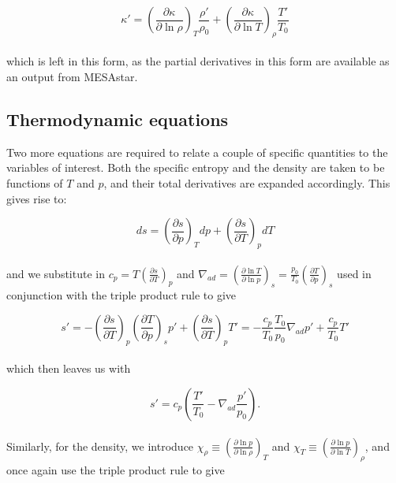 \documentclass[11pt]{amsart}
\begin{document}
\begin{equation}
\kappa' = \left( \frac{\partial \kappa}{\partial \ln \rho} \right)_{T} \frac{\rho'}{\rho_{0}} + \left( \frac{\partial \kappa}{\partial \ln T} \right)_{\rho} \frac{T'}{T_{0}}
\end{equation}
\\
which is left in this form, as the partial derivatives in this form are available as an output from MESAstar.



\subsection{Thermodynamic equations}

Two more equations are required to relate a couple of specific quantities to the variables of interest.
Both the specific entropy and the density are taken to be functions of $T$ and $p$, and their total derivatives
are expanded accordingly.  This gives rise to:

\begin{equation}
ds = \left( \frac{\partial s}{\partial p} \right)_{T} dp +\left( \frac{\partial s}{\partial T} \right)_{p} dT
\end{equation} 
\\
and we substitute in $c_{p} = T \left( \frac{\partial s}{\partial T} \right)_{p}$ and 
$\nabla_{ad} = \left( \frac{\partial \ln T}{\partial \ln p} \right)_{s} = \frac{p_{0}}{T_{0}} \left( \frac{\partial T}{\partial p} \right)_{s}$ used in conjunction with
the triple product rule to give

\begin{equation}
s' = - \left( \frac{\partial s}{\partial T} \right)_{p} \left( \frac{\partial T}{\partial p} \right)_{s} p' +\left( \frac{\partial s}{\partial T} \right)_{p} T'
= - \frac{c_{p}}{T_{0}} \frac{T_{0}}{p_{0}} \nabla_{ad} p' + \frac{c_{p}}{T_{0}} T'
\end{equation} 
\\
which then leaves us with

\begin{equation}
s' = c_{p} \left( \frac{T'}{T_{0}} - \nabla_{ad} \frac{p'}{p_{0}} \right).
\end{equation} 
\\
Similarly, for the density, we introduce $\chi_{\rho} \equiv \left( \frac{\partial \ln p}{\partial \ln \rho} \right)_{T}$
 and $\chi_{T} \equiv \left( \frac{\partial \ln p}{\partial \ln T} \right)_{\rho}$, and once again use the 
 triple product rule to give
 
\end{document}
